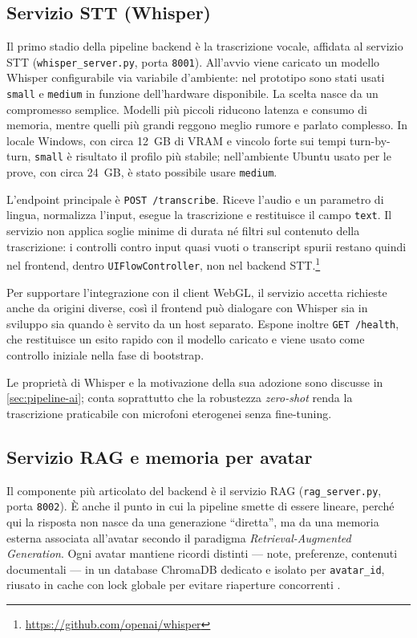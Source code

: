 \subsection{Servizio STT (Whisper)}

Il primo stadio della pipeline backend è la trascrizione vocale, affidata al servizio STT (\texttt{whisper\_server.py}, porta \texttt{8001}). All'avvio viene caricato un modello Whisper configurabile via variabile d'ambiente: nel prototipo sono stati usati \texttt{small} e \texttt{medium} in funzione dell'hardware disponibile. La scelta nasce da un compromesso semplice. Modelli più piccoli riducono latenza e consumo di memoria, mentre quelli più grandi reggono meglio rumore e parlato complesso. In locale Windows, con circa 12~GB di VRAM e vincolo forte sui tempi turn-by-turn, \texttt{small} è risultato il profilo più stabile; nell'ambiente Ubuntu usato per le prove, con circa 24~GB, è stato possibile usare \texttt{medium}.

L'endpoint principale è \texttt{POST /transcribe}. Riceve l'audio e un parametro di lingua, normalizza l'input, esegue la trascrizione e restituisce il campo \texttt{text}. Il servizio non applica soglie minime di durata né filtri sul contenuto della trascrizione: i controlli contro input quasi vuoti o transcript spurii restano quindi nel frontend, dentro \texttt{UIFlowController}, non nel backend STT.\footnote{\url{https://github.com/openai/whisper}}

Per supportare l'integrazione con il client WebGL, il servizio accetta richieste anche da origini diverse, così il frontend può dialogare con Whisper sia in sviluppo sia quando è servito da un host separato. Espone inoltre \texttt{GET /health}, che restituisce un esito rapido con il modello caricato e viene usato come controllo iniziale nella fase di bootstrap.

Le proprietà di Whisper e la motivazione della sua adozione sono discusse in \autoref{sec:pipeline-ai}; conta soprattutto che la robustezza \emph{zero-shot} renda la trascrizione praticabile con microfoni eterogenei senza fine-tuning.

\subsection{Servizio RAG e memoria per avatar}\label{subsec:rag-memory}

Il componente più articolato del backend è il servizio RAG (\texttt{rag\_server.py}, porta \texttt{8002}). È anche il punto in cui la pipeline smette di essere lineare, perché qui la risposta non nasce da una generazione “diretta”, ma da una memoria esterna associata all'avatar secondo il paradigma \emph{Retrieval-Augmented Generation}. Ogni avatar mantiene ricordi distinti --- note, preferenze, contenuti documentali --- in un database ChromaDB dedicato e isolato per \texttt{avatar\_id}, riusato in cache con lock globale per evitare riaperture concorrenti \cite{ChromaDB2026}.

